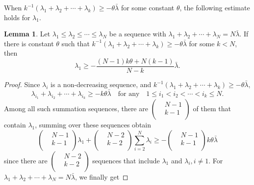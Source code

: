 \documentclass[11pt, reqno]{amsart}
\numberwithin{equation}{section}
\theoremstyle{definition}
\newtheorem{lemma}[thm]{Lemma}
\begin{document}
	
	When $k^{-1}({\lambda }_1+{\lambda }_2+\cdots +{\lambda }_k)\ge -\theta \bar{\lambda }$ for some constant $\theta$, the following estimate holds for ${\lambda }_1$.		
	\begin{lemma} \label{lemma2}
		Let ${\lambda }_1\le {\lambda }_2\le \cdots \le {\lambda }_N$ be a sequence with ${\lambda }_1+{\lambda }_2+\cdots +{\lambda }_N=N\bar{\lambda }$. If there is constant $\theta$ such that $k^{-1}({\lambda }_1+{\lambda }_2+\cdots +{\lambda }_k)\ge -\theta \bar{\lambda}$ for some $k< N$, then
		\[{{\lambda }_{1}}\ge -\frac{(N-1)k\theta +N(k-1)}{N-k}\bar{\lambda }.\]
	\end{lemma}
	\begin{proof}
		
		Since ${{\lambda }_{i}}$ is a non-decreasing sequence, and $k^{-1}({\lambda }_1+{\lambda }_2+\cdots +{\lambda }_k)\ge -\theta \bar{\lambda}$, 
		$${{\lambda }_{i_1}}+{{\lambda }_{i_2}}+\cdots +{{\lambda }_{i_k}}\ge -k\theta \bar{\lambda} \quad\text{for any}\quad 1\le i_1<i_2<\cdots <i_k\le N.$$
		Among all such summation sequences, there are $\left( \begin{aligned}
			& N-1 \\ 
			& k-1 \\
		\end{aligned} \right)$ of them that contain ${\lambda }_1$, summing over these sequences obtain
		\[\left( \begin{aligned}
			& N-1 \\ 
			& k-1 \\ 
		\end{aligned} \right){{\lambda }_{1}}+\left( \begin{aligned}
			& N-2 \\ 
			& k-2 \\ 
		\end{aligned} \right)\sum\limits_{i=2}^{N}{{\lambda }_i}\ge -\left( \begin{aligned}
			& N-1 \\ 
			& k-1 \\ 
		\end{aligned} \right)k\theta \bar{\lambda}\]
		since there are $\left( \begin{aligned}
			& N-2 \\ 
			& k-2 \\ 
		\end{aligned} \right)$ sequences that include ${\lambda }_1$ and ${\lambda }_i,i\ne 1.$ For ${{\lambda }_{1}}+{{\lambda }_{2}}+\cdots +{{\lambda }_{N}}=N\bar{\lambda}$, we finally get 

\end{proof}
\end{document}
